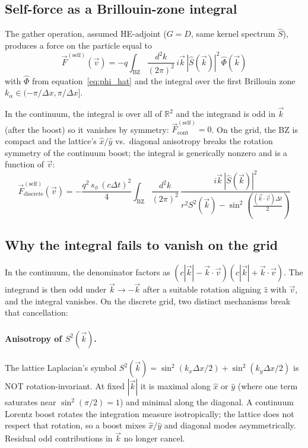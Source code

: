 \documentclass[11pt,a4paper]{article}
\begin{document}
\subsection{Self-force as a Brillouin-zone integral}

The gather operation, assumed HE-adjoint ($G = D$, same kernel
spectrum $\hat S$), produces a force on the particle equal to
\begin{equation}
\vec F^{(\mathrm{self})}(\vec v)
 = - q \int_{\mathrm{BZ}} \frac{d^2 k}{(2\pi)^2}\,
     i \vec k\, |\hat S(\vec k)|^2\, \hat\Phi(\vec k)
\label{eq:F_self}
\end{equation}
with $\hat\Phi$ from equation~\ref{eq:phi_hat} and the integral over
the first Brillouin zone $k_\alpha \in (-\pi/\Delta x, \pi/\Delta x]$.

In the continuum, the integral is over all of $\mathbb{R}^2$ and the
integrand is odd in $\vec k$ (after the boost) so it vanishes by
symmetry: $\vec F^{(\mathrm{self})}_{\mathrm{cont}} = 0$.  On the
grid, the BZ is compact and the lattice's $\hat x/\hat y$ vs.\
diagonal anisotropy breaks the rotation symmetry of the continuum
boost; the integral is generically nonzero and is a function of
$\vec v$:
\begin{equation}
\boxed{\;\;
\vec F^{(\mathrm{self})}_{\mathrm{discrete}}(\vec v)
 = -\frac{q^2\, s_\phi\, (c \Delta t)^2}{4}
   \int_{\mathrm{BZ}} \frac{d^2 k}{(2\pi)^2}\,
   \frac{i \vec k\, |\hat S(\vec k)|^2}
        {r^2 S^2(\vec k) - \sin^2\!\left(\frac{(\vec k \cdot \vec v)\Delta t}{2}\right)}
\;\;}
\label{eq:F_self_explicit}
\end{equation}

\subsection{Why the integral fails to vanish on the grid}

In the continuum, the denominator factors as $(c|\vec k| - \vec k\cdot\vec v)(c|\vec k| + \vec k\cdot\vec v)$.  The integrand is then odd under
$\vec k \to -\vec k$ after a suitable rotation aligning $\hat z$ with $\vec v$, and the integral vanishes.  On the discrete grid, two distinct mechanisms break that cancellation:

\paragraph{Anisotropy of $S^2(\vec k)$.}
The lattice Laplacian's symbol $S^2(\vec k) = \sin^2(k_x\Delta x/2) + \sin^2(k_y\Delta x/2)$ is NOT rotation-invariant.  At fixed $|\vec k|$ it is maximal along $\hat x$ or $\hat y$ (where one term saturates near $\sin^2(\pi/2) = 1$) and minimal along the diagonal.  A continuum Lorentz boost rotates the integration measure isotropically; the lattice does not respect that rotation, so a boost mixes $\hat x/\hat y$ and diagonal modes asymmetrically.  Residual odd contributions in $\vec k$ no longer cancel.
\end{document}
